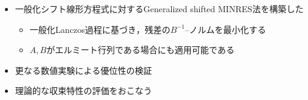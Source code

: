 
\begin{itemize}
	\item 一般化シフト線形方程式に対するGeneralized shifted MINRES法を構築した
		\begin{itemize}
			\item 一般化Lanczos過程に基づき，残差の$B^{-1}$--ノルムを最小化する
			\item $A, B$がエルミート行列である場合にも適用可能である
		\end{itemize}
	\item 更なる数値実験による優位性の検証
	\item 理論的な収束特性の評価をおこなう
\end{itemize}
